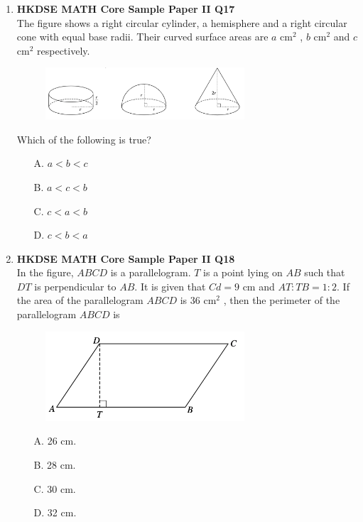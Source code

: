 \documentclass[12pt]{article}
\begin{document}
\begin{enumerate}
	\item \textbf{HKDSE MATH Core Sample Paper II Q17}\\
	The figure shows a right circular cylinder, a hemisphere and a right circular cone with equal base radii. Their curved surface areas are $a$ cm$^2$ , $b$ cm$^2$ and $c$ cm$^2$ respectively.\\
	\begin{figure}[H]
		\centering
		\includegraphics[width = 0.7\textwidth]{SPFigure2.17.png}	
	\end{figure}
	Which of the following is true?
	\begin{enumerate}
		\item[A.] $a < b < c$
		\item[B.] $a < c < b$
		\item[C.] $c < a < b$
		\item[D.] $c < b < a$
	\end{enumerate}

	\item \textbf{HKDSE MATH Core Sample Paper II Q18}\\
	In the figure, $ABCD$ is a parallelogram. $T$ is a point lying on $AB$ such that $DT$ is perpendicular to $AB$. It is given that $Cd = 9$ cm and $AT : TB = 1 : 2$. If the area of the parallelogram $ABCD$ is 36 cm$^2$ , then the perimeter of the parallelogram $ABCD$ is
	\begin{figure}[H]
		\centering
		\includegraphics[width = 0.7\textwidth]{SPFigure2.18.png}	
	\end{figure}
	\begin{enumerate}
		\item[A.] 26 cm.
		\item[B.] 28 cm.
		\item[C.] 30 cm.
		\item[D.] 32 cm.
	\end{enumerate}


\end{enumerate}
\end{document}
